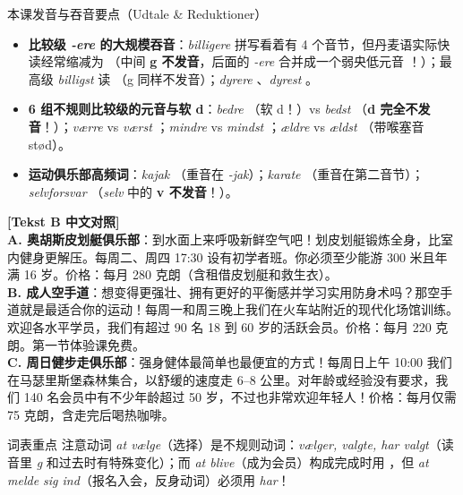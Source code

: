 \begin{tipbox}{本课发音与吞音要点（Udtale \& Reduktioner）}
\begin{itemize}
  \item \textbf{比较级 \textit{-ere} 的大规模吞音}：\textit{billigere} 拼写看着有 4 个音节，但丹麦语实际快读经常缩减为 （中间 \textbf{g 不发音}，后面的 \textit{-ere} 合并成一个弱央低元音 ！）；最高级 \textit{billigst} 读 （g 同样不发音）；\textit{dyrere} 、\textit{dyrest} 。
  \item \textbf{6 组不规则比较级的元音与软 d}：\textit{bedre} （软 d！）vs \textit{bedst} （\textbf{d 完全不发音}！）；\textit{værre}  vs \textit{værst} ；\textit{mindre}  vs \textit{mindst} ；\textit{ældre}  vs \textit{ældst} （带喉塞音 stød）。
  \item \textbf{运动俱乐部高频词}：\textit{kajak} （重音在 \textit{-jak}）；\textit{karate} （重音在第二音节）；\textit{selvforsvar} （\textit{selv} 中的 \textbf{v 不发音}！）。
\end{itemize}
\end{tipbox}

\begin{transbox}
\small
\textbf{\color{NCDTeal}[Tekst B 中文对照]}\\
\textbf{A. 奥胡斯皮划艇俱乐部}：到水面上来呼吸新鲜空气吧！划皮划艇锻炼全身，比室内健身更解压。每周二、周四 17:30 设有初学者班。你必须至少能游 300 米且年满 16 岁。价格：每月 280 克朗（含租借皮划艇和救生衣）。\\
\textbf{B. 成人空手道}：想变得更强壮、拥有更好的平衡感并学习实用防身术吗？那空手道就是最适合你的运动！每周一和周三晚上我们在火车站附近的现代化场馆训练。欢迎各水平学员，我们有超过 90 名 18 到 60 岁的活跃会员。价格：每月 220 克朗。第一节体验课免费。\\
\textbf{C. 周日健步走俱乐部}：强身健体最简单也最便宜的方式！每周日上午 10:00 我们在马瑟里斯堡森林集合，以舒缓的速度走 6--8 公里。对年龄或经验没有要求，我们 140 名会员中有不少年龄超过 50 岁，不过也非常欢迎年轻人！价格：每月仅需 75 克朗，含走完后喝热咖啡。
\end{transbox}


\begin{tipbox}{词表重点}
注意动词 \textit{at vælge}（选择）是不规则动词：\textit{vælger, valgte, har valgt}（读音里 \textit{g} 和过去时有特殊变化）；而 \textit{at blive}（成为会员）构成完成时用 ，但 \textit{at melde sig ind}（报名入会，反身动词）必须用 \textit{har}！
\end{tipbox}

